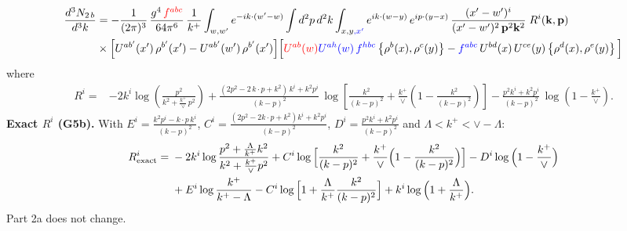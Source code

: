 \documentclass[9pt]{article}
\numberwithin{equation}{section}
\begin{document}
\begin{align}
\frac{d^{3}N_{2\,b}}{d^{3}k} & = -\frac{1}{(2\pi)^{3}}\,\frac{g^{4}\,{\color{red}f^{abc}}}{64\pi^{6}}\,\frac{1}{k^{+}}\int_{w,w'} e^{-ik\cdot(w'-w)}
\int d^{2}p\,d^{2}k\int_{x,y{\color{blue},x^{\prime}}} e^{ik\cdot(w-y)}\,e^{ip\cdot(y-x)}\,\frac{(x'-w')^{i}}{(x'-w')^{2}\,\mathbf{p}^{2}\mathbf{k}^{2}}\;R^{i}(\mathbf{k},\mathbf{p})\notag\\
&\times\Big[U^{ab'}(x')\,\rho^{b'}(x')-U^{ab'}(w')\,\rho^{b'}(x')\Big]
\Big[{\color{red}U^{ab}(w)}{\color{blue}U^{ah}(w)\,f^{hbc}}\left\{\rho^{b}(x),\rho^{c}(y)\right\}-{\color{blue}f^{abc}}\,U^{bd}(x)\,U^{ce}(y)\left\{\rho^{d}(x),\rho^{e}(y)\right\}\Big]
\end{align}
where
\begin{align}
R^{i} ={}& -2k^{i}\log\left(\frac{p^{2}}{k^{2}+\frac{k^{+}}{\vee}\,p^{2}}\right)
+\frac{(2p^{2}-2\,k\cdot p+k^{2})\,k^{i}+k^{2}p^{i}}{(k-p)^{2}}\,
\log\left[\frac{k^{2}}{(k-p)^{2}}+\frac{k^{+}}{\vee}\left(1-\frac{k^{2}}{(k-p)^{2}}\right)\right]
-\frac{p^{2}k^{i}+k^{2}p^{i}}{(k-p)^{2}}\,\log\left(1-\frac{k^{+}}{\vee}\right).
\end{align}
\begingroup\color{blue}\noindent\textbf{Exact $R^{i}$ (G5b).} With $E^{i}=\frac{k^{2}p^{i}-k\cdot p\,k^{i}}{(k-p)^{2}}$, $C^{i}=\frac{(2p^{2}-2k\cdot p+k^{2})k^{i}+k^{2}p^{i}}{(k-p)^{2}}$, $D^{i}=\frac{p^{2}k^{i}+k^{2}p^{i}}{(k-p)^{2}}$ and $\Lambda<k^{+}<\vee-\Lambda$:
\begin{align*}
R^{i}_{\rm exact}={}&-2k^{i}\log\frac{p^{2}+\frac{\Lambda}{k^{+}}k^{2}}{k^{2}+\frac{k^{+}}{\vee}p^{2}}+C^{i}\log\Big[\frac{k^{2}}{(k-p)^{2}}+\frac{k^{+}}{\vee}\Big(1-\frac{k^{2}}{(k-p)^{2}}\Big)\Big]-D^{i}\log\Big(1-\frac{k^{+}}{\vee}\Big)\\
&+E^{i}\log\frac{k^{+}}{k^{+}-\Lambda}-C^{i}\log\Big[1+\frac{\Lambda}{k^{+}}\frac{k^{2}}{(k-p)^{2}}\Big]+k^{i}\log\Big(1+\frac{\Lambda}{k^{+}}\Big).
\end{align*}
Part 2a does not change.\par\endgroup
\end{document}

